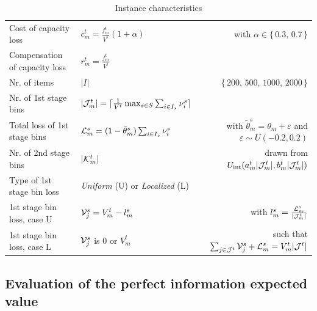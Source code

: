 \documentclass[a4paper,11pt]{article}
\begin{document}
\begin{table}[htb!]
\begin{tabular}{llr}
			Cost of capacity loss                               & $c^t_m = \frac{f^t_m}{V^t}(1 + \alpha)$ & with $ \alpha \in \{ \, 0.3, \, 0.7 \, \}$ \\
			Compensation of capacity loss                       & $r^t_m = \frac{f_m^t}{V^t}$             & \\
			
			Nr. of items                                        & $ |I|$                                  & $ \{ \, 200, \, 500, \, 1000, \, 2000 \, \}$ \\

			
			Nr. of 1st stage bins                               & $ | {\cal J}^t_m | = \lceil \frac{1}{V^t} \max_{s \in S} \sum_{i \in I_s} \nu^s_i \rceil $ & \\
			Total loss of 1st stage bins                        & ${\cal L}^s_m = (1 - \tilde{\theta}^s_m) \sum_{i \in I_s} \nu^s_i$ & with $ \tilde{\theta}^s_m = \theta_m + \varepsilon$ and $  \varepsilon \sim U(-0.2, 0.2)$ \\
			Nr. of 2nd stage bins                               & $ | {\cal K}^t_m |$                     & drawn from $ U_{\text{int}}( a^t_m | {\cal J}^t_m |, b^t_m | {\cal J}^t_m |)$  \\
			Type of 1st stage bin loss                          & \textit{Uniform} (U) or \textit{Localized} (L) & \\
			1st stage bin loss, case U                          & ${\cal V}^s_j = V^t_m - l^s_m$ & with $ l^s_m = \frac{{\cal L}^s_m}{|{\cal J}^t_m|} $ \\
			1st stage bin loss, case L                          & ${\cal V}^s_j$ is $0$ or $ V^t_m $ & such that $ \sum_{j \in {\cal J}^t} {\cal V}^s_j + {\cal L}^s_m = V^t_m |{\cal J}^t| $ \\
			\hline
		\end{tabular}
		\caption{Instance characteristics}
		\label{tab:instance_generation}
	\end{table}

	{
	}

	\subsection{Evaluation of the perfect information expected value}
	
	
	
	
\end{document}
